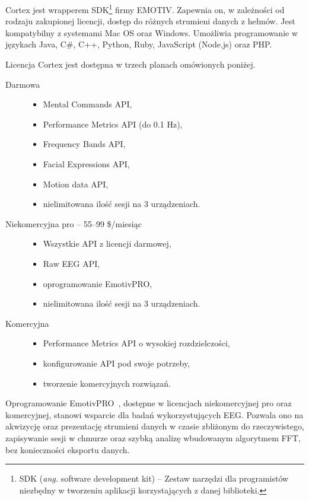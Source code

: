 \documentclass[skorowidz,skroty]{dyplomWEZUT}
\begin{document}
Cortex jest wrapperem SDK\footnote{SDK (\textit{ang.} software development kit) -- Zestaw narzędzi dla programistów niezbędny w tworzeniu aplikacji korzystających z danej biblioteki.\label{foot:sdk}} firmy EMOTIV. Zapewnia on, w zależności od rodzaju zakupionej licencji, dostęp do różnych strumieni danych z hełmów. Jest kompatybilny z systemami Mac OS oraz Windows. Umożliwia programowanie w językach Java, C\#, C++, Python, Ruby, JavaScript (Node.js) oraz PHP.

\pagebreak
Licencja Cortex jest dostępna w trzech planach omówionych poniżej.
\begin{description}
    \item [Darmowa] \hfill
    \begin{itemize}
        \item Mental Commands API,
        \item Performance Metrics API (do 0.1 Hz),
        \item Frequency Bands API,
        \item Facial Expressions API,
        \item Motion data API,
        \item nielimitowana ilość sesji na 3 urządzeniach.
    \end{itemize}
    \item [Niekomercyjna pro -- 55--99 \$/miesiąc] \hfill
    \begin{itemize}
        \item Wszystkie API z licencji darmowej,
        \item Raw EEG API,
        \item oprogramowanie EmotivPRO,
        \item nielimitowana ilość sesji na 3 urządzeniach.
    \end{itemize}
    \item [Komercyjna] \hfill
    \begin{itemize}
        \item Performance Metrics API o wysokiej rozdzielczości,
        \item konfigurowanie API pod swoje potrzeby,
        \item tworzenie komercyjnych rozwiązań.
    \end{itemize}
\end{description}

Oprogramowanie EmotivPRO~\cite{emotiv_pro}, dostępne w licencjach niekomercyjnej pro oraz komercyjnej, stanowi wsparcie dla badań wykorzystujących EEG. Pozwala ono na akwizycję oraz prezentację strumieni danych w czasie zbliżonym do rzeczywistego, zapisywanie sesji w chmurze oraz szybką analizę wbudowanym algorytmem FFT, bez konieczności eksportu danych.
\end{document}
